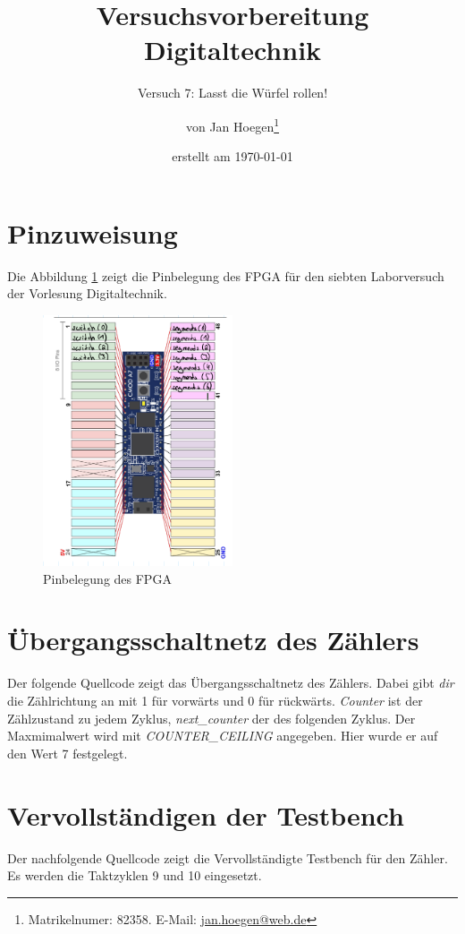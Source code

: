 \documentclass[
    paper=a4,
    parskip=half,
]{scrartcl}
\title{Versuchsvorbereitung Digitaltechnik}
\subtitle{Versuch 7: Lasst die Würfel rollen!}
\author{von Jan Hoegen\thanks{Matrikelnumer: 82358. E-Mail: \href{mailto:jan.hoegen@web.de}{jan.hoegen@web.de}}}
\date{erstellt am \today}
\begin{document}
\maketitle

\tableofcontents

\newpage

\section{Pinzuweisung}
    Die Abbildung \ref{fig:io} zeigt die Pinbelegung des FPGA für den siebten Laborversuch der Vorlesung Digitaltechnik.

    \begin{figure}[hbt]
        \centering
        \includegraphics[width=0.5\textwidth]{PinBelegung.png}
        \caption{Pinbelegung des FPGA}
        \label{fig:io}
    \end{figure}

\section{Übergangsschaltnetz des Zählers}

    Der folgende Quellcode zeigt das Übergangsschaltnetz des Zählers. Dabei gibt 
    \textit{dir} die Zählrichtung an mit 1 für vorwärts und 0 für rückwärts. \textit{Counter} ist der Zählzustand zu jedem Zyklus, \textit{next\_counter} der des folgenden Zyklus. Der Maxmimalwert wird mit \textit{COUNTER\_CEILING} angegeben. Hier wurde er auf den Wert 7 festgelegt.
    
    

\section{Vervollständigen der Testbench}

    Der nachfolgende Quellcode zeigt die Vervollständigte Testbench für den Zähler. Es werden die Taktzyklen 9 und 10 eingesetzt.

    
\end{document}

